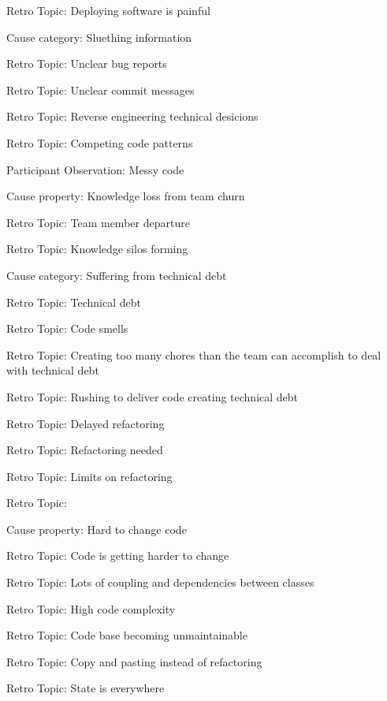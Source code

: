 \quad \quad Retro Topic: Deploying software is painful

\quad Cause category: Sluething information

\quad \quad Retro Topic: Unclear bug reports

\quad \quad Retro Topic: Unclear commit messages

\quad \quad Retro Topic: Reverse engineering technical desicions

\quad \quad Retro Topic: Competing code patterns

\quad \quad Participant Observation: Messy code

\quad \quad Cause property: Knowledge loss from team churn

\quad \quad Retro Topic: Team member departure

\quad \quad Retro Topic: Knowledge silos forming

\quad Cause category: Suffering from technical debt

\quad \quad Retro Topic: Technical debt

\quad \quad Retro Topic: Code smells

\quad \quad Retro Topic: Creating too many chores than the team can accomplish to deal with technical debt

\quad \quad Retro Topic: Rushing to deliver code creating technical debt

\quad \quad \quad Retro Topic: Delayed refactoring

\quad \quad \quad Retro Topic: Refactoring needed 

\quad \quad \quad Retro Topic: Limits on refactoring

\quad \quad \quad Retro Topic: 

\quad \quad Cause property: Hard to change code

\quad \quad \quad Retro Topic: Code is getting harder to change

\quad \quad \quad Retro Topic: Lots of coupling and dependencies between classes

\quad \quad \quad Retro Topic: High code complexity

\quad \quad \quad Retro Topic: Code base becoming unmaintainable

\quad \quad \quad Retro Topic: Copy and pasting instead of refactoring

\quad \quad \quad Retro Topic: State is everywhere

